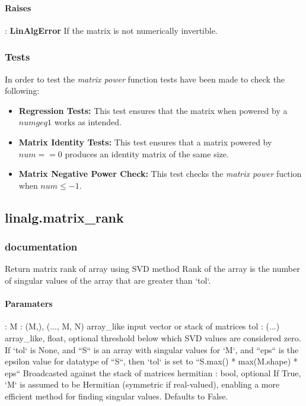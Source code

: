 \documentclass[a4paper,11pt]{article}
\begin{document}
\paragraph{Raises}:	\textbf{LinAlgError} If the matrix is not numerically invertible.

\subsubsection{Tests}
In order to test the \textit{matrix power} function tests have been made to check the following:

\begin{itemize}
	\item \textbf{Regression Tests:} This test ensures that the matrix when powered by a $ num  geq  1 $ works as intended.
	\item \textbf{Matrix Identity Tests:} This test ensures that a matrix powered by $ num  ==  0 $ produces an identity matrix of the same size. 
	\item \textbf{Matrix Negative Power Check:} This test checks the \emph{matrix power} fuction when $ num  \leq  -1 $.
\end{itemize}


\subsection{linalg.matrix\_rank}
\subsubsection{documentation}
Return matrix rank of array using SVD method
Rank of the array is the number of singular values of the array that are
greater than `tol`.
\paragraph{Paramaters}:  M : {(M,), (..., M, N)} array\_like input vector or stack of matrices
tol : (...) array\_like, float, optional
threshold below which SVD values are considered zero. If `tol` is None, and ``S`` is an array with singular values for `M`, and ``eps`` is the epsilon value for datatype of ``S``, then `tol` is set to ``S.max() * max(M.shape) * eps`` Broadcasted against the stack of matrices hermitian : bool, optional If True, `M` is assumed to be Hermitian (symmetric if real-valued),
enabling a more efficient method for finding singular values. Defaults to False.
\end{document}
